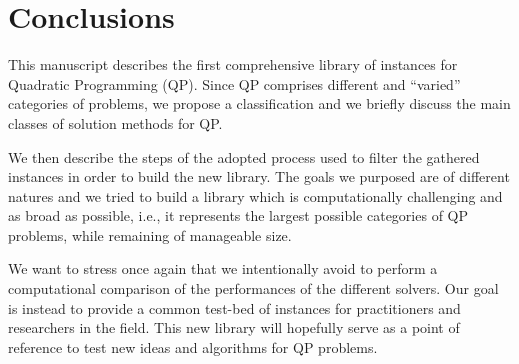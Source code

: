 \section{Conclusions}\label{sec:conclusions}

 This manuscript describes the first comprehensive library of instances for Quadratic Programming (QP). Since QP comprises  different and ``varied'' categories of problems, we propose a classification and we briefly discuss the main classes of solution methods for QP. 

We then describe the steps of the adopted process used to filter the gathered instances  in order to build the new library. The goals we purposed are of different natures and we tried to build a library which is computationally challenging and as broad as possible, i.e., it represents the largest possible categories of QP problems, while remaining of manageable size.
 

We want to stress once again that we intentionally avoid to perform a computational comparison of the performances of the different solvers. Our goal is instead to provide a common test-bed of instances for practitioners and researchers in the field. This new library will hopefully serve as a point of reference to test new ideas and algorithms for QP problems.
